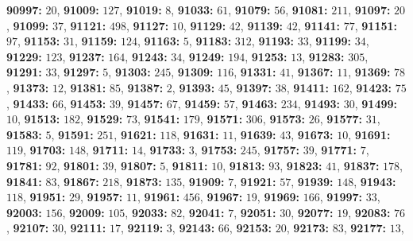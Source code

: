 \textsf{\bfseries 90997:} $20$, \textsf{\bfseries 91009:} $127$, \textsf{\bfseries 91019:} $8$, \textsf{\bfseries 91033:} $61$, \textsf{\bfseries 91079:} $56$, \textsf{\bfseries 91081:} $211$, \textsf{\bfseries 91097:} $20$, \textsf{\bfseries 91099:} $37$, \textsf{\bfseries 91121:} $498$, \textsf{\bfseries 91127:} $10$, \textsf{\bfseries 91129:} $42$, \textsf{\bfseries 91139:} $42$, \textsf{\bfseries 91141:} $77$, \textsf{\bfseries 91151:} $97$, \textsf{\bfseries 91153:} $31$, \textsf{\bfseries 91159:} $124$, \textsf{\bfseries 91163:} $5$, \textsf{\bfseries 91183:} $312$, \textsf{\bfseries 91193:} $33$, \textsf{\bfseries 91199:} $34$, \textsf{\bfseries 91229:} $123$, \textsf{\bfseries 91237:} $164$, \textsf{\bfseries 91243:} $34$, \textsf{\bfseries 91249:} $194$, \textsf{\bfseries 91253:} $13$, \textsf{\bfseries 91283:} $305$, \textsf{\bfseries 91291:} $33$, \textsf{\bfseries 91297:} $5$, \textsf{\bfseries 91303:} $245$, \textsf{\bfseries 91309:} $116$, \textsf{\bfseries 91331:} $41$, \textsf{\bfseries 91367:} $11$, \textsf{\bfseries 91369:} $78$, \textsf{\bfseries 91373:} $12$, \textsf{\bfseries 91381:} $85$, \textsf{\bfseries 91387:} $2$, \textsf{\bfseries 91393:} $45$, \textsf{\bfseries 91397:} $38$, \textsf{\bfseries 91411:} $162$, \textsf{\bfseries 91423:} $75$, \textsf{\bfseries 91433:} $66$, \textsf{\bfseries 91453:} $39$, \textsf{\bfseries 91457:} $67$, \textsf{\bfseries 91459:} $57$, \textsf{\bfseries 91463:} $234$, \textsf{\bfseries 91493:} $30$, \textsf{\bfseries 91499:} $10$, \textsf{\bfseries 91513:} $182$, \textsf{\bfseries 91529:} $73$, \textsf{\bfseries 91541:} $179$, \textsf{\bfseries 91571:} $306$, \textsf{\bfseries 91573:} $26$, \textsf{\bfseries 91577:} $31$, \textsf{\bfseries 91583:} $5$, \textsf{\bfseries 91591:} $251$, \textsf{\bfseries 91621:} $118$, \textsf{\bfseries 91631:} $11$, \textsf{\bfseries 91639:} $43$, \textsf{\bfseries 91673:} $10$, \textsf{\bfseries 91691:} $119$, \textsf{\bfseries 91703:} $148$, \textsf{\bfseries 91711:} $14$, \textsf{\bfseries 91733:} $3$, \textsf{\bfseries 91753:} $245$, \textsf{\bfseries 91757:} $39$, \textsf{\bfseries 91771:} $7$, \textsf{\bfseries 91781:} $92$, \textsf{\bfseries 91801:} $39$, \textsf{\bfseries 91807:} $5$, \textsf{\bfseries 91811:} $10$, \textsf{\bfseries 91813:} $93$, \textsf{\bfseries 91823:} $41$, \textsf{\bfseries 91837:} $178$, \textsf{\bfseries 91841:} $83$, \textsf{\bfseries 91867:} $218$, \textsf{\bfseries 91873:} $135$, \textsf{\bfseries 91909:} $7$, \textsf{\bfseries 91921:} $57$, \textsf{\bfseries 91939:} $148$, \textsf{\bfseries 91943:} $118$, \textsf{\bfseries 91951:} $29$, \textsf{\bfseries 91957:} $11$, \textsf{\bfseries 91961:} $456$, \textsf{\bfseries 91967:} $19$, \textsf{\bfseries 91969:} $166$, \textsf{\bfseries 91997:} $33$, \textsf{\bfseries 92003:} $156$, \textsf{\bfseries 92009:} $105$, \textsf{\bfseries 92033:} $82$, \textsf{\bfseries 92041:} $7$, \textsf{\bfseries 92051:} $30$, \textsf{\bfseries 92077:} $19$, \textsf{\bfseries 92083:} $76$, \textsf{\bfseries 92107:} $30$, \textsf{\bfseries 92111:} $17$, \textsf{\bfseries 92119:} $3$, \textsf{\bfseries 92143:} $66$, \textsf{\bfseries 92153:} $20$, \textsf{\bfseries 92173:} $83$, \textsf{\bfseries 92177:} $13$, 
